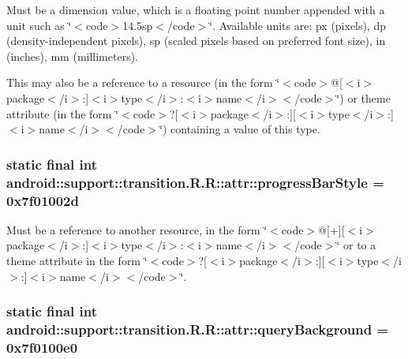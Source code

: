 Must be a dimension value, which is a floating point number appended with a unit such as \char`\"{}$<$code$>$14.5sp$<$/code$>$\char`\"{}. Available units are: px (pixels), dp (density-independent pixels), sp (scaled pixels based on preferred font size), in (inches), mm (millimeters). 

This may also be a reference to a resource (in the form \char`\"{}$<$code$>$@\mbox{[}$<$i$>$package$<$/i$>$:\mbox{]}$<$i$>$type$<$/i$>$:$<$i$>$name$<$/i$>$$<$/code$>$\char`\"{}) or theme attribute (in the form \char`\"{}$<$code$>$?\mbox{[}$<$i$>$package$<$/i$>$:\mbox{]}\mbox{[}$<$i$>$type$<$/i$>$:\mbox{]}$<$i$>$name$<$/i$>$$<$/code$>$\char`\"{}) containing a value of this type. \hypertarget{classandroid_1_1support_1_1transition_1_1_r_1_1attr_bb05a7f1eaccbe1bfbc075deebde3747}{
\subsubsection[{progressBarStyle}]{\setlength{\rightskip}{0pt plus 5cm}static final int android::support::transition.R.R::attr::progressBarStyle = 0x7f01002d}}
\label{classandroid_1_1support_1_1transition_1_1_r_1_1attr_bb05a7f1eaccbe1bfbc075deebde3747}


Must be a reference to another resource, in the form \char`\"{}$<$code$>$@\mbox{[}+\mbox{]}\mbox{[}$<$i$>$package$<$/i$>$:\mbox{]}$<$i$>$type$<$/i$>$:$<$i$>$name$<$/i$>$$<$/code$>$\char`\"{} or to a theme attribute in the form \char`\"{}$<$code$>$?\mbox{[}$<$i$>$package$<$/i$>$:\mbox{]}\mbox{[}$<$i$>$type$<$/i$>$:\mbox{]}$<$i$>$name$<$/i$>$$<$/code$>$\char`\"{}. \hypertarget{classandroid_1_1support_1_1transition_1_1_r_1_1attr_6ce220342bda6f1db008fcbb7636cb46}{
\subsubsection[{queryBackground}]{\setlength{\rightskip}{0pt plus 5cm}static final int android::support::transition.R.R::attr::queryBackground = 0x7f0100e0}}
\label{classandroid_1_1support_1_1transition_1_1_r_1_1attr_6ce220342bda6f1db008fcbb7636cb46}


